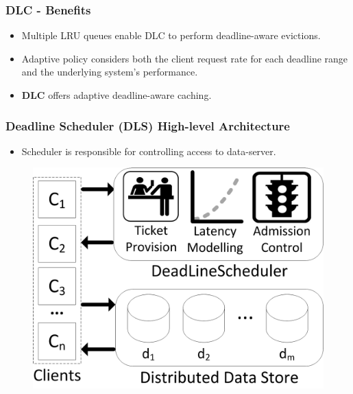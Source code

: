 \documentclass{beamer}
\newcommand{\myv}{\vspace{3 mm}}
\begin{document}
\begin{frame}
  \frametitle{DLC - Benefits}
  \vspace{-15 mm}
  \begin{itemize}
  \item Multiple LRU queues enable DLC to perform deadline-aware evictions.
    \myv
  \item Adaptive policy considers both the client request rate for each
    deadline range and the underlying system's performance.  \myv

  \item \textbf{DLC} offers adaptive deadline-aware caching.
  \end{itemize}
\end{frame}


\begin{frame}
  \frametitle{Deadline Scheduler (DLS) High-level Architecture}
  \begin{itemize}
  \item Scheduler is responsible for controlling access to
    data-server.
  \end{itemize}
  \begin{figure}
    \begin{center}
      \centerline{\includegraphics[scale=0.90]{img/DLS.png}}
    \end{center}
  \end{figure}
\end{frame}
\end{document}
